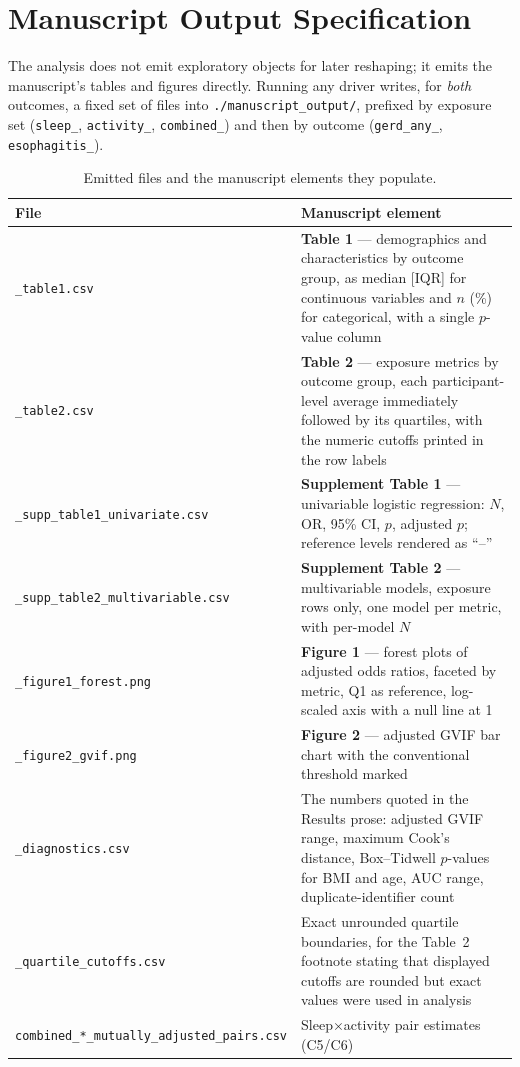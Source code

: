 \documentclass[11pt]{article}
\newcommand{\code}[1]{\texttt{\small #1}}
\begin{document}
\section{Manuscript Output Specification}
\label{sec:outputs}
The analysis does not emit exploratory objects for later reshaping; it emits the manuscript's tables
and figures directly. Running any driver writes, for \emph{both} outcomes, a fixed set of files into
\code{./manuscript_output/}, prefixed by exposure set (\code{sleep_}, \code{activity_},
\code{combined_}) and then by outcome (\code{gerd_any_}, \code{esophagitis_}).

\begin{table}[h]\centering\footnotesize
\begin{tabular}{@{}p{6.0cm}p{7.6cm}@{}}
\toprule
\textbf{File} & \textbf{Manuscript element} \\
\midrule
\code{*_table1.csv} & \textbf{Table 1} --- demographics and characteristics by outcome group, as
median [IQR] for continuous variables and $n$ (\%) for categorical, with a single $p$-value column \\
\addlinespace
\code{*_table2.csv} & \textbf{Table 2} --- exposure metrics by outcome group, each participant-level
average immediately followed by its quartiles, with the numeric cutoffs printed in the row labels \\
\addlinespace
\code{*_supp_table1_univariate.csv} & \textbf{Supplement Table 1} --- univariable logistic regression:
$N$, OR, 95\% CI, $p$, adjusted $p$; reference levels rendered as ``--'' \\
\addlinespace
\code{*_supp_table2_multivariable.csv} & \textbf{Supplement Table 2} --- multivariable models, exposure
rows only, one model per metric, with per-model $N$ \\
\addlinespace
\code{*_figure1_forest.png} & \textbf{Figure 1} --- forest plots of adjusted odds ratios, faceted by
metric, Q1 as reference, log-scaled axis with a null line at 1 \\
\addlinespace
\code{*_figure2_gvif.png} & \textbf{Figure 2} --- adjusted GVIF bar chart with the conventional
threshold marked \\
\addlinespace
\code{*_diagnostics.csv} & The numbers quoted in the Results prose: adjusted GVIF range, maximum
Cook's distance, Box--Tidwell $p$-values for BMI and age, AUC range, duplicate-identifier count \\
\addlinespace
\code{*_quartile_cutoffs.csv} & Exact unrounded quartile boundaries, for the Table~2 footnote stating
that displayed cutoffs are rounded but exact values were used in analysis \\
\addlinespace
\code{combined_*_mutually_adjusted_pairs.csv} & Sleep$\times$activity pair estimates (C5/C6) \\
\bottomrule
\end{tabular}
\caption{Emitted files and the manuscript elements they populate.}
\end{table}
\end{document}
